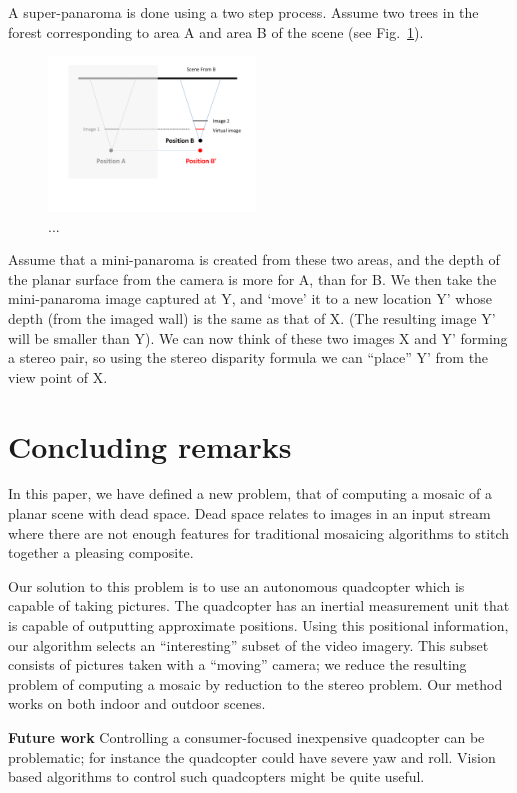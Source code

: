 \documentclass[10pt,twocolumn,letterpaper]{article}
\begin{document}
A super-panaroma is done using a two step process. Assume two trees in
the forest corresponding to area A and area B of the scene (see
Fig.~\ref{fig:stereo}). 
\begin{figure}[h!]
  \centering
  \includegraphics[width=0.49\textwidth]{figures/move} 
  \caption{ \label{fig:stereo} ...  }
\end{figure}    
Assume that a mini-panaroma is created from these two areas, and the
depth of the planar surface from the camera is more for A, than for
B. We then take the mini-panaroma image captured at Y, and `move' it to
a new location Y’ whose depth (from the imaged wall) is the same as
that of X. (The resulting image Y’ will be smaller than Y). We can now
think of these two images X and Y’ forming a stereo pair, so using the
stereo disparity formula we can ``place'' Y’ from the view point of X.



\section{Concluding remarks}

In this paper, we have defined a new problem, that of computing a
mosaic of a planar scene with dead space.  Dead space relates to images
in an input stream where there are not enough features for traditional
mosaicing algorithms to stitch together a pleasing composite.  

Our solution to this problem is to use an autonomous quadcopter which
is capable of taking pictures.  The quadcopter has an inertial
measurement unit that is capable of outputting approximate
positions. Using this positional information, our algorithm selects an
``interesting'' subset of the video imagery.  This subset consists of
pictures taken with a ``moving'' camera; we reduce the resulting
problem of computing a mosaic by reduction to the stereo problem.  Our
method works on both indoor and outdoor scenes.

{\bf Future work} Controlling a consumer-focused inexpensive
quadcopter can be problematic; for instance the quadcopter could have
severe yaw and roll.  Vision based algorithms to control such
quadcopters might be quite useful.
\end{document}
